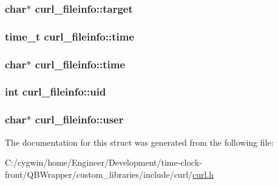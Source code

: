 \subsubsection[{target}]{\setlength{\rightskip}{0pt plus 5cm}char$\ast$ curl\+\_\+fileinfo\+::target}\label{structcurl__fileinfo_a68e8fc68544920dc452306a79bea8907}
\hypertarget{structcurl__fileinfo_a5136db1360519440e97f481a9a05da0f}{}
\subsubsection[{time}]{\setlength{\rightskip}{0pt plus 5cm}time\+\_\+t curl\+\_\+fileinfo\+::time}\label{structcurl__fileinfo_a5136db1360519440e97f481a9a05da0f}
\hypertarget{structcurl__fileinfo_ab25d86f3b4f3c89fb924c6af136b350c}{}
\subsubsection[{time}]{\setlength{\rightskip}{0pt plus 5cm}char$\ast$ curl\+\_\+fileinfo\+::time}\label{structcurl__fileinfo_ab25d86f3b4f3c89fb924c6af136b350c}
\hypertarget{structcurl__fileinfo_aa6fed17f82b0137397ebcb7b35c4c100}{}
\subsubsection[{uid}]{\setlength{\rightskip}{0pt plus 5cm}int curl\+\_\+fileinfo\+::uid}\label{structcurl__fileinfo_aa6fed17f82b0137397ebcb7b35c4c100}
\hypertarget{structcurl__fileinfo_af65d2a4ca6d383fcba5db89f2bf124e3}{}
\subsubsection[{user}]{\setlength{\rightskip}{0pt plus 5cm}char$\ast$ curl\+\_\+fileinfo\+::user}\label{structcurl__fileinfo_af65d2a4ca6d383fcba5db89f2bf124e3}


The documentation for this struct was generated from the following file\+:\begin{DoxyCompactItemize}
\item 
C\+:/cygwin/home/\+Engineer/\+Development/time-\/clock-\/front/\+Q\+B\+Wrapper/custom\+\_\+libraries/include/curl/\hyperlink{curl_8h}{curl.\+h}\end{DoxyCompactItemize}
